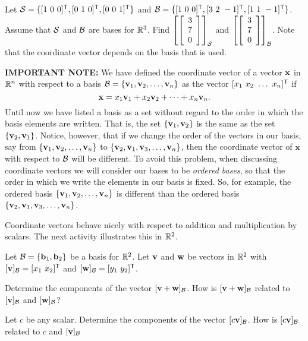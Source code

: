 \begin{activity} \label{act:3_e_1} Let $\mathcal{S} = \{[1 \ 0 \ 0]^{\mathsf{T}},[0 \ 1 \ 0]^{\mathsf{T}}, [0 \ 0 \ 1]^{\mathsf{T}}\}$ and $\CB = \{[1 \ 0 \ 0]^{\tr}, [3 \ 2 \ -1]^{\tr}, [1 \ 1 \ -1]^{\tr}\}$. Assume that $\mathcal{S}$ and $\mathcal{B}$ are bases for $\mathbb{R}^3$. Find $\left[\left[ \begin{array}{c} 3\\ 7 \\ 0\end{array} \right]\right]_{\mathcal{S}}$ and $\left[\left[ \begin{array}{c} 3\\ 7 \\ 0\end{array} \right]\right]_{\mathcal{B}}$. Note that the coordinate vector depends on the basis that is used. 

\end{activity}

\noindent \textbf{IMPORTANT NOTE:} We have defined the coordinate vector of a vector $\mathbf{x}$ in $\mathbb{R}^n$ with respect to a basis $\mathcal{B} = \{\mathbf{v}_1, \mathbf{v}_2, \ldots, \mathbf{v}_n\}$ as the vector $[x_1 \ x_2 \ \ldots \ x_n]^{\tr}$ if 
\[\mathbf{x} = x_1 \mathbf{v}_1 + x_2 \mathbf{v}_2 + \cdots + x_n \mathbf{v}_n.\]
Until now we have listed a basis as a set without regard to the order in which the basis elements are written. That is, the set $\{\mathbf{v}_1, \mathbf{v}_2\}$ is the same as the set $\{\mathbf{v}_2, \mathbf{v}_1\}$. Notice, however, that if we change the order of the vectors in our basis, say from $\{\mathbf{v}_1, \mathbf{v}_2, \ldots, \mathbf{v}_n\}$ to  $\{\mathbf{v}_2, \mathbf{v}_1, \mathbf{v}_3, \ldots, \mathbf{v}_n\}$, then the coordinate vector of $\mathbf{x}$ with respect to $\mathcal{B}$ will be different. To avoid this problem, when discussing coordinate vectors we will consider our bases to be \emph{ordered bases}, so that the order in which we write the elements in our basis is fixed. So, for example, the ordered basis $\{\mathbf{v}_1, \mathbf{v}_2, \ldots, \mathbf{v}_n\}$ is different than the ordered basis $\{\mathbf{v}_2, \mathbf{v}_1, \mathbf{v}_3, \ldots, \mathbf{v}_n\}$. 

Coordinate vectors behave nicely with respect to addition and multiplication by scalars. The next activity illustrates this in $\mathbb{R}^2$. 

\begin{activity} \label{act:3_e_coor_vect_props} Let $\mathcal{B} = \{\mathbf{b}_1, \mathbf{b}_2\}$ be a basis for $\mathbb{R}^2$. Let $\mathbf{v}$ and $\mathbf{w}$ be vectors in $\mathbb{R}^2$ with $[\mathbf{v}]_{\mathcal{B}} = [x_1 \ x_2]^{\mathsf{T}}$ and $[\mathbf{w}]_{\mathcal{B}} = [y_1 \ y_2]^{\mathsf{T}}$. 
\ba
\item Determine the components of the vector $[ \mathbf{v} + \mathbf{w}]_{\mathcal{B}}$. How is $[ \mathbf{v} + \mathbf{w}]_{\mathcal{B}}$ related to $[ \mathbf{v}]_{\mathcal{B}}$ and $[\mathbf{w}]_{\mathcal{B}}$? 

\item Let $c$ be any scalar. Determine the components of the vector $[ c\mathbf{v}]_{\mathcal{B}}$. How is $[ c\mathbf{v}]_{\mathcal{B}}$ related to $c$ and $[ \mathbf{v}]_{\mathcal{B}}$ 

\ea

\end{activity} 

